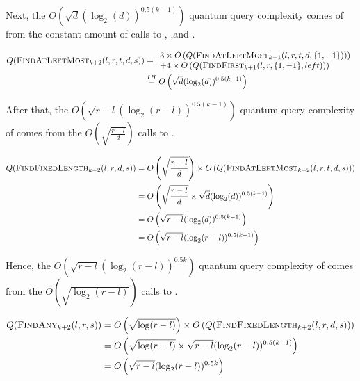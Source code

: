 \begin{appendix}
\begin{tproof}
{            Next, the $ O\left(\sqrt{d}(\log_2(d))^{0.5(k-1)} \right)$ quantum query complexity comes of from the constant amount
            of calls to ,  ,and .

            \begin{align*}
                Q(\textrm{\textsc{FindAtLeftMost$_{k+2}$}}(l,r,t,d,s)) & = \begin{array}{l}
                    3 \times O\left(Q(\textrm{\textsc{FindAtLeftMost$_{k+1}$}}(l,r,t,d,\{1,-1\}))\right) \\
                    + 4 \times O\left(Q(\textrm{\textsc{FindFirst$_{k+1}$}}(l,r,\{1,-1\},left))\right)
                \end{array}                                  \\
                                                  & \overset{IH}{=} O\left(\sqrt{d}(\log_2(d))^{0.5(k-1)} \right)
            \end{align*}

            After that, the $O\left( \sqrt{r-l}(\log_2(r-l))^{0.5(k-1)}\right)$ quantum query complexity of  comes from the
            $O\left(\sqrt{\frac{r-l}{d}}\right)$ calls to .

            \begin{align*}
                Q(\textrm{\textsc{FindFixedLength$_{k+2}$}}(l, r, d, s)) & = O\left(\sqrt{\frac{r-l}{d}}\right) \times O\left(Q(\textrm{\textsc{FindAtLeftMost$_{k+2}$}}(l,r,t,d,s))\right) \\
                                                  & = O\left( \sqrt{\frac{r-l}{d}} \times \sqrt{d}(\log_2(d))^{0.5(k-1)}\right)                 \\
                                                  & = O\left( \sqrt{r-l}(\log_2(d))^{0.5(k-1)}\right)                                           \\
                                                  & = O\left( \sqrt{r-l}(\log_2(r-l))^{0.5(k-1)}\right)
            \end{align*}

            Hence, the $O\left( \sqrt{r-l}(\log_2(r-l))^{0.5k} \right)$ quantum query complexity of  comes from
            the $O\left(\sqrt{\log_2(r-l)}\right)$ calls to .

            \begin{align*}
                Q(\textrm{\textsc{FindAny$_{k+2}$}}(l, r, s)) & = O\left(\sqrt{\log(r-l)}\right) \times O\left(Q(\textrm{\textsc{FindFixedLength$_{k+2}$}}(l, r, d, s))\right) \\
                                              & = O\left( \sqrt{\log(r-l)} \times \sqrt{r-l}(\log_2(r-l))^{0.5(k-1)} \right)            \\
                                              & = O\left( \sqrt{r-l}(\log_2(r-l))^{0.5k} \right)                                        \\
            \end{align*}

}
\end{tproof}
\end{appendix}
